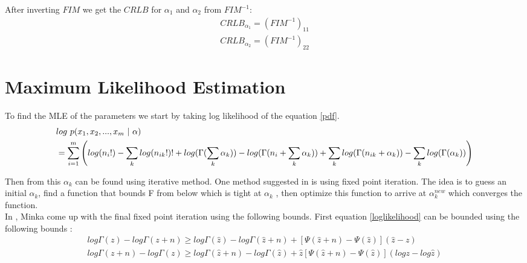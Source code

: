 \documentclass{article} %
\newcommand{\?}{\stackrel{?}{=}}
\begin{document}
After inverting $FIM$ we get the $CRLB$ for $\alpha_1$ and $\alpha_2$ from $FIM^{-1}$:\\

\begin{align}
CRLB_{\alpha_1}=(FIM^{-1})_{11}\\
CRLB_{\alpha_2}=(FIM^{-1})_{22}
\end{align}


\section{Maximum Likelihood Estimation} \label{ML}
To find the MLE of the parameters we start by taking log likelihood of the equation \ref{pdf}.
\begin{align}
&log\ p(x_1,x_2, ..., x_m\ |\ \alpha)\notag\\
&=\sum_{i=1}^{m}{\left( log(n_i!) - \sum_{k}log(n_{ik}!)! + log(\Gamma(\sum_{k}\alpha_k))
- log(\Gamma(n_i+\sum_{k}\alpha_k)) + \sum_{k} log(\Gamma(n_{ik} + \alpha_k)) - \sum_{k} log(\Gamma(\alpha_k)) \right)}\label{loglikelihood}
\end{align}

Then from this $\alpha_k$ can be found using iterative method. One method suggested in \cite{minka} is using fixed point iteration. The idea is to guess an
initial $\alpha_k$, find a function that bounds F from below which is tight at $\alpha_k$ , then
optimize this function to arrive at $\alpha_k^{new}$ which converges the function.\\ 
In \cite{minka}, Minka come up with the final fixed point iteration using the following bounds. First equation \ref{loglikelihood} can be bounded using the following bounds \cite{Guo76}:
\begin{align}
log \Gamma(z) -log\Gamma(z+n) \geq log\Gamma(\hat{z}) - log\Gamma(\hat{z}+n) + [\Psi(\hat{z}+n)-\Psi(\hat{z})](\hat{z}-z)\label{bound1} \\
log \Gamma(z+n) -log\Gamma(z) \geq log\Gamma(\hat{z}+n) - log\Gamma(\hat{z}) + \hat{z}[\Psi(\hat{z}+n)-\Psi(\hat{z})](log z - log \hat{z})\label{bound2}
\end{align}
\end{document}
